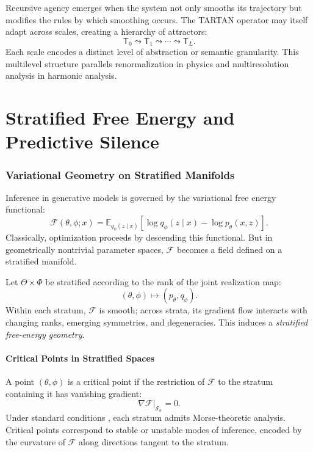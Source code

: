 \documentclass[12pt]{article}
\theoremstyle{plain}
\theoremstyle{definition}
\theoremstyle{remark}
\newcommand{\ThetaSpace}{\Theta}
\newcommand{\Stratum}{\mathcal{S}}
\newcommand{\FreeEnergy}{\mathcal{F}}
\newcommand{\TartanOp}{\mathsf{T}}
\begin{document}
Recursive agency emerges when the system not only smooths its trajectory but 
modifies the rules by which smoothing occurs. The TARTAN operator may itself 
adapt across scales, creating a hierarchy of attractors:
\[
\TartanOp_0 \leadsto \TartanOp_1 \leadsto \cdots \leadsto \TartanOp_L.
\]
Each scale encodes a distinct level of abstraction or semantic granularity.
This multilevel structure parallels renormalization in physics and 
multiresolution analysis in harmonic analysis.

\newpage

\part{Stratified Free Energy and Predictive Silence}

\section{Variational Geometry on Stratified Manifolds}

Inference in generative models is governed by the variational free energy
functional:
\[
\FreeEnergy(\theta,\phi;x)
= \mathbb{E}_{q_\phi(z\mid x)}
  \left[
    \log q_\phi(z\mid x) - \log p_\theta(x,z)
  \right].
\]
Classically, optimization proceeds by descending this functional. But in 
geometrically nontrivial parameter spaces, $\FreeEnergy$ becomes a field
defined on a stratified manifold.

Let $\ThetaSpace \times \Phi$ be stratified according to the rank of the 
joint realization map:
\[
(\theta,\phi) \mapsto (p_\theta, q_\phi).
\]
Within each stratum, $\FreeEnergy$ is smooth; across strata, its gradient
flow interacts with changing ranks, emerging symmetries, and degeneracies.
This induces a \emph{stratified free-energy geometry}.

\subsection{Critical Points in Stratified Spaces}

A point $(\theta,\phi)$ is a critical point if the restriction of $\FreeEnergy$
to the stratum containing it has vanishing gradient:
\[
\nabla \FreeEnergy
\big\vert_{\Stratum_\alpha} = 0.
\]
Under standard conditions \citep{goresky1988stratified}, each stratum 
admits Morse-theoretic analysis. Critical points correspond to stable or 
unstable modes of inference, encoded by the curvature of $\FreeEnergy$ 
along directions tangent to the stratum.
\end{document}
